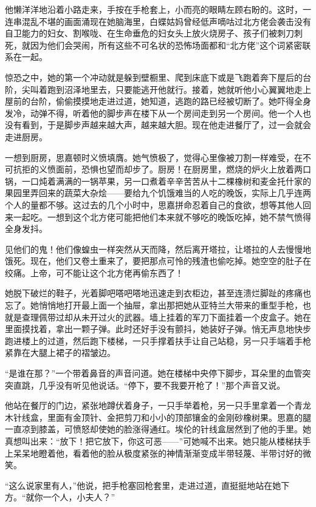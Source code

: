 \par 他懒洋洋地沿着小路走来，手按在手枪套上，小而亮的眼睛左顾右盼的。这时，一连串混乱不堪的画面涌现在她脑海里，白蝶姑妈曾经低声嘀咕过北方佬会袭击没有自卫能力的妇女、割喉咙、在生命垂危的妇女头上放火烧房子、孩子们被刺刀刺死，就因为他们会哭闹，所有这些不可名状的恐怖场面都和“北方佬”这个词紧密联系在一起。
\par 惊恐之中，她的第一个冲动就是躲到壁橱里、爬到床底下或是飞跑着奔下屋后的台阶，尖叫着跑到沼泽地里去，只要能逃开他就行。接着，她就听他小心翼翼地走上屋前的台阶，偷偷摸摸地走进过道，她知道，逃跑的路已经被切断了。她吓得全身发冷，动弹不得，听着他的脚步声在楼下从一个房间走到另一个房间。他一个人也没有看到，于是脚步声越来越大声，越来越大胆。现在他走进餐厅了，过一会就会走进厨房。
\par 一想到厨房，思嘉顿时义愤填膺。她气愤极了，觉得心里像被刀割一样难受，在不可抗拒的义愤面前，恐惧也望而却步了。厨房！在厨房里，燃烧的炉火上放着两口锅，一口炖着满满的一锅苹果，另一口煮着辛辛苦苦从十二棵橡树和麦金托什家的果园里弄回来的蔬菜大杂烩——要给九个饥饿难当的人吃的晚饭，实际上几乎连两个人的量都不够。这过去的几个小时中，思嘉拼命忍着自己的食欲，想等其他人回来一起吃。一想到这个北方佬可能把他们本来就不够吃的晚饭吃掉，她不禁气愤得全身发抖。
\par 见他们的鬼！他们像蝗虫一样突然从天而降，然后离开塔拉，让塔拉的人去慢慢地饿死。现在，他们又卷土重来了，要把那点可怜的残渣也偷吃掉。她空空的肚子在绞痛。上帝，可不能让这个北方佬再偷东西了！
\par 她脱下破烂的鞋子，光着脚吧嗒吧嗒地迅速走到衣柜边，甚至连溃烂脚趾的疼痛也忘了。她悄悄地打开最上面一个抽屉，拿出那把她从亚特兰大带来的重型手枪，也就是查理佩带过却从未开过火的武器。墙上挂着的军刀下面挂着一个皮盒子。她在里面摸找着，拿出一颗子弹。此时还好手没有颤抖，她装好子弹。悄无声息地快步跑进楼上的过道，然后跑下楼梯，一只手撑着扶手让自己站稳，另一只手端着手枪紧靠在大腿上裙子的褶皱边。
\par “是谁在那？”一个带着鼻音的声音问道。她在楼梯中央停下脚步，耳朵里的血管突突直跳，几乎没有听见他说话。“停下，要不我要开枪了！”那个声音又说。
\par 他站在餐厅的门边，紧张地蹲伏着身子，一只手举着枪，另一只手里拿着一个青龙木针线盒，里面有金顶针、金把剪刀和小小的顶部镶金的金刚砂橡树果。思嘉的腿一直凉到膝盖，可愤怒却使她的脸涨得通红。埃伦的针线盒居然到了他的手里。她真想叫出来：“放下！把它放下，你这可恶——”可她喊不出来。她只能从楼梯扶手上呆呆地瞪着他，看着他的脸从极度紧张的神情渐渐变成半带轻蔑、半带讨好的微笑。
\par “这么说家里有人，”他说，把手枪塞回枪套里，走进过道，直挺挺地站在她下方。“就你一个人，小夫人？”

